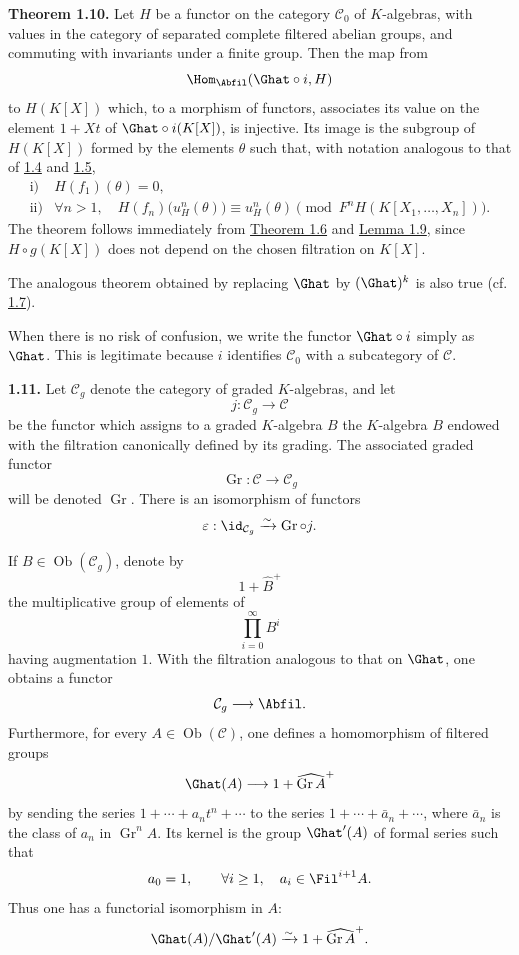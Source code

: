 \textbf{Theorem 1.10.} Let \(H\) be a functor on the category \(\mathcal C_0\) of \(K\)-algebras, with values in the category of separated complete filtered abelian groups, and commuting with invariants under a finite group. Then the map from
\[
  \Hom_{\Abfil}(\Ghat\circ i,H)
\]
to \(H(K[X])\) which, to a morphism of functors, associates its value on the element \(1+Xt\) of \(\Ghat\circ i(K[X])\), is injective. Its image is the subgroup of \(H(K[X])\) formed by the elements \(\theta\) such that, with notation analogous to that of \hyperlink{sga6.e05.para.1-4}{1.4} and \hyperlink{sga6.e05.para.1-5}{1.5},
\[
\begin{array}{ll}
\text{i)}& H(f_1)(\theta)=0,\\[0.3em]
\text{ii)}& \forall n>1,\quad
 H(f_n)\bigl(u_H^n(\theta)\bigr)\equiv u_H^n(\theta)
 \pmod{F^nH(K[X_1,\ldots,X_n])}.
\end{array}
\]
The theorem follows immediately from \hyperlink{sga6.e05.thm.1-6}{Theorem 1.6} and \hyperlink{sga6.e05.lem.1-9}{Lemma 1.9}, since \(H\circ g(K[X])\) does not depend on the chosen filtration on \(K[X]\).

The analogous theorem obtained by replacing \(\Ghat\) by \((\Ghat)^k\) is also true (cf. \hyperlink{sga6.e05.para.1-7}{1.7}).

When there is no risk of confusion, we write the functor \(\Ghat\circ i\) simply as \(\Ghat\). This is legitimate because \(i\) identifies \(\mathcal C_0\) with a subcategory of \(\mathcal C\).

\textbf{1.11.} Let \(\mathcal C_g\) denote the category of graded \(K\)-algebras, and let
\[
  j:\mathcal C_g\longrightarrow\mathcal C
\]
be the functor which assigns to a graded \(K\)-algebra \(B\) the \(K\)-algebra \(B\) endowed with the filtration canonically defined by its grading. The associated graded functor
\[
  \operatorname{Gr}:\mathcal C\longrightarrow \mathcal C_g
\]
will be denoted \(\operatorname{Gr}\). There is an isomorphism of functors
\[
  \varepsilon:\id_{\mathcal C_g}\xrightarrow{\sim}\operatorname{Gr}\circ j.
\]

If \(B\in\operatorname{Ob}(\mathcal C_g)\), denote by
\[
  1+\widehat{B}^{+}
\]
the multiplicative group of elements of
\[
  \prod_{i=0}^{\infty}B^i
\]
having augmentation \(1\). With the filtration analogous to that on \(\Ghat\), one obtains a functor
\[
  \mathcal C_g\longrightarrow\Abfil.
\]
Furthermore, for every \(A\in\operatorname{Ob}(\mathcal C)\), one defines a homomorphism of filtered groups
\[
  \Ghat(A)\longrightarrow 1+\widehat{\operatorname{Gr}A}^{+}
\]
by sending the series \(1+\cdots+a_nt^n+\cdots\) to the series \(1+\cdots+\bar a_n+\cdots\), where \(\bar a_n\) is the class of \(a_n\) in \(\operatorname{Gr}^nA\). Its kernel is the group \(\Ghat'(A)\) of formal series such that
\[
  a_0=1,\qquad \forall i\geq 1,\quad a_i\in\Fil^{i+1}A.
\]
Thus one has a functorial isomorphism in \(A\):
\[
  \Ghat(A)/\Ghat'(A)\xrightarrow{\sim} 1+\widehat{\operatorname{Gr}A}^{+}.
\]

